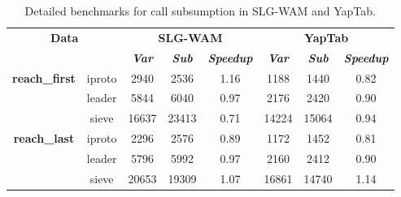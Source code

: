 \begin{table}[ht]
\centering
\footnotesize{
  \begin{tabular}{cc|ccc|ccc}
   \hline
    \hline
    \multicolumn{2}{c|}{\multirow{2}{*}{\small{\textbf{Data}}}} & \multicolumn{3}{c|}{\small{\textbf{SLG-WAM}}} & \multicolumn{3}{c}{\small{\textbf{YapTab}}} \\
     \multicolumn{2}{c|}{} & \textbf{\textit{Var}} & \textbf{\textit{Sub}} & \textbf{\textit{Speedup}} & \textbf{\textit{Var}} & \textbf{\textit{Sub}} & \textbf{\textit{Speedup}} \\
   \hline
   \hline

\multirow{3}{*}{\textbf{reach\_first}} &  \scriptsize{iproto}  &  2940 & 2536 &  1.16  & 1188 & 1440 &  0.82 \\
&  \scriptsize{leader}  &  5844 & 6040 &  0.97  & 2176 & 2420 &  0.90 \\
&  \scriptsize{sieve}  &  16637 & 23413 &  0.71  & 14224 & 15064 &  0.94 \\
\hline
\multirow{3}{*}{\textbf{reach\_last}} &  \scriptsize{iproto}  &  2296 & 2576 &  0.89  & 1172 & 1452 &  0.81 \\
&  \scriptsize{leader}  &  5796 & 5992 &  0.97  & 2160 & 2412 &  0.90 \\
&  \scriptsize{sieve}  &  20653 & 19309 &  1.07  & 16861 & 14740 &  1.14 \\
\hline
\hline
\end{tabular}
}
\caption{Detailed benchmarks for call subsumption in SLG-WAM and YapTab.}
\label{tbl:result_model_detail}
\end{table}